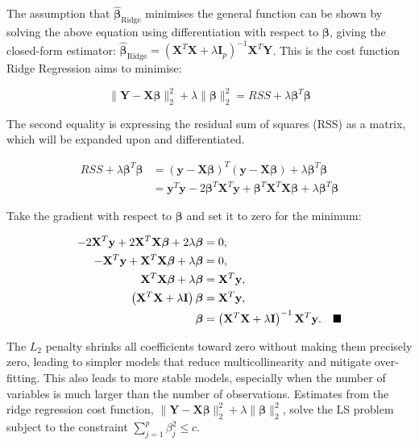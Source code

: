 \documentclass[12pt]{report} %
\begin{document}
The assumption that $\boldsymbol{\hat{\beta}}_{\text{Ridge}}$ minimises the general function can be shown by solving the above equation using differentiation with respect to $\boldsymbol{\beta}$, giving the closed-form estimator: $\boldsymbol{\hat{\beta}}_{\text{Ridge}} = \left( \mathbf{X}^T \mathbf{X} + \lambda \mathbf{I}_p \right)^{-1} \mathbf{X}^T \mathbf{Y}$.\cite{reza2024} This is the cost function Ridge Regression aims to minimise: 

\[
\|\boldsymbol{Y} - \boldsymbol{X\beta}\|_2^2 + \lambda \|\boldsymbol{\beta}\|_2^2 =
RSS + \lambda \boldsymbol{\beta}^T \boldsymbol{\beta}
\]


\noindent The second equality is expressing the residual sum of squares (RSS) as a matrix, which will be expanded upon and differentiated.

\begin{align*}
RSS + \lambda \boldsymbol{\beta}^T \boldsymbol{\beta} 
    &= (\mathbf{y} - \mathbf{X} \boldsymbol{\beta})^T (\mathbf{y} - \mathbf{X} \boldsymbol{\beta}) + \lambda \boldsymbol{\beta}^T \boldsymbol{\beta} \\
    &= \mathbf{y}^T \mathbf{y} - 2 \boldsymbol{\beta}^T \mathbf{X}^T \mathbf{y} + \boldsymbol{\beta}^T \mathbf{X}^T \mathbf{X} \boldsymbol{\beta} + \lambda \boldsymbol{\beta}^T \boldsymbol{\beta}
\end{align*}

\noindent Take the gradient with respect to $\boldsymbol{\beta}$ and set it to zero for the minimum:

\begin{align*}
-2 \mathbf{X}^T \mathbf{y} + 2 \mathbf{X}^T \mathbf{X} \boldsymbol{\beta} + 2 \lambda \boldsymbol{\beta} &= 0, \\
- \mathbf{X}^T \mathbf{y} + \mathbf{X}^T \mathbf{X} \boldsymbol{\beta} + \lambda \boldsymbol{\beta} &= 0, \\
\mathbf{X}^T \mathbf{X} \boldsymbol{\beta} + \lambda \boldsymbol{\beta} &= \mathbf{X}^T \mathbf{y}, \\
\left( \mathbf{X}^T \mathbf{X} + \lambda \mathbf{I} \right) \boldsymbol{\beta} &= \mathbf{X}^T \mathbf{y}, \\
\boldsymbol{\beta} &= \left( \mathbf{X}^T \mathbf{X} + \lambda \mathbf{I} \right)^{-1} \mathbf{X}^T \mathbf{y}.
\quad \hfill \blacksquare
\end{align*}

The $L_2$ penalty shrinks all coefficients toward zero without making them precisely zero, leading to simpler models that reduce multicollinearity and mitigate over-fitting.\cite{hailiang2023} This also leads to more stable models, especially when the number of variables is much larger than the number of observations.\cite{reza2024} Estimates from the ridge regression cost function, $ \|\boldsymbol{Y} - \boldsymbol{X\beta}\|_2^2 + \lambda \|\boldsymbol{\beta}\|_2^2$, solve the LS problem subject to the constraint $\sum_{j=1}^p \beta_j^2 \leq c$.\cite{hailiang2023} 
\end{document}
